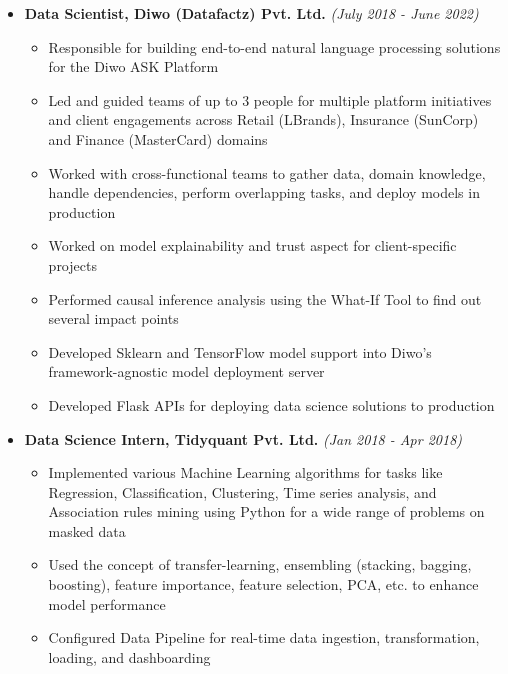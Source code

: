 \documentclass[a4paper,10pt]{article}
\newcommand{\isep}{-2 pt}
\begin{document}
\begin{itemize}
    \item \textbf{Data Scientist, Diwo (Datafactz) Pvt. Ltd.} \hfill {\emph{(July 2018 - June 2022)}}
    \\ [-0.6cm]
    \begin{itemize}\itemsep \isep
        \item Responsible for building end-to-end natural language processing solutions for the Diwo ASK Platform
        \item Led and guided teams of up to 3 people for multiple platform initiatives and client engagements across Retail (LBrands), Insurance (SunCorp) and Finance (MasterCard) domains
        \item Worked with cross-functional teams to gather data, domain knowledge, handle dependencies, perform overlapping tasks, and deploy models in production  
        \item Worked on model explainability and trust aspect for client-specific projects
        \item Performed causal inference analysis using the What-If Tool to find out several impact points
        \item Developed Sklearn and TensorFlow model support into Diwo's framework-agnostic model deployment server
        \item Developed Flask APIs for deploying data science solutions to production
    \\ [-0.5cm]
    \end{itemize}
    
    \item \textbf{Data Science Intern, Tidyquant Pvt. Ltd.} \hfill {\emph{(Jan 2018 - Apr 2018)}}
    \\ [-0.6cm]
    \begin{itemize}\itemsep \isep
        \item Implemented various Machine Learning algorithms for tasks like Regression, Classification, Clustering, Time series analysis, and Association rules mining using Python for a wide range of problems on masked data 
        \item Used the concept of transfer-learning, ensembling (stacking, bagging, boosting), feature importance, feature selection, PCA, etc. to enhance model performance 
        \item Configured Data Pipeline for real-time data ingestion, transformation, loading, and dashboarding
    \\ [-0.5cm]
    \end{itemize}
\end{itemize}
\end{document}

